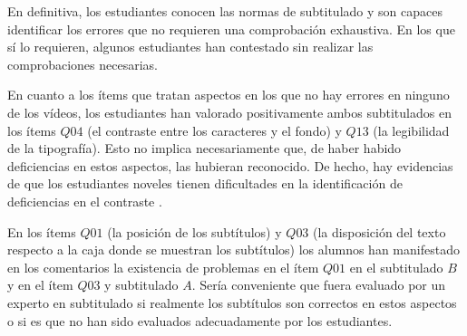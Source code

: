 \documentclass[
  12pt,
  a4paper,
  extrafontsizes,
  onecolumn,
  openright,
  table]{memoir}
\begin{document}
En definitiva, los estudiantes conocen las normas de subtitulado y son
capaces identificar los errores que no requieren una comprobación
exhaustiva. En los que sí lo requieren, algunos estudiantes han
contestado sin realizar las comprobaciones necesarias.

En cuanto a los ítems que tratan aspectos en los que no hay errores en
ninguno de los vídeos, los estudiantes han valorado positivamente ambos
subtitulados en los ítems \(Q04\) (el contraste entre los caracteres y
el fondo) y \(Q13\) (la legibilidad de la tipografía). Esto no implica
necesariamente que, de haber habido deficiencias en estos aspectos, las
hubieran reconocido. De hecho, hay evidencias de que los estudiantes
noveles tienen dificultades en la identificación de deficiencias en el
contraste \autocite[ver][]{jperez2}.

En los ítems \(Q01\) (la posición de los subtítulos) y \(Q03\) (la
disposición del texto respecto a la caja donde se muestran los
subtítulos) los alumnos han manifestado en los comentarios la existencia
de problemas en el ítem \(Q01\) en el subtitulado \(B\) y en el ítem
\(Q03\) y subtitulado \(A\). Sería conveniente que fuera evaluado por un
experto en subtitulado si realmente los subtítulos son correctos en
estos aspectos o si es que no han sido evaluados adecuadamente por los
estudiantes.
\end{document}
